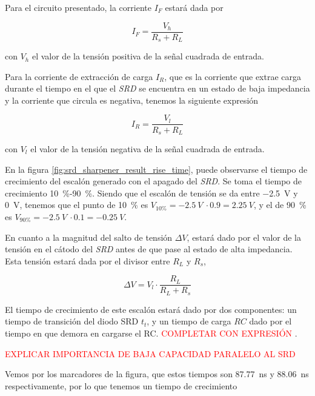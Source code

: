 Para el circuito presentado, la corriente $I_F$ estará dada por

\begin{equation}
    I_{F} = \frac{V_h}{R_s+R_L}
\end{equation}

con $V_h$ el valor de la tensión positiva de la señal cuadrada de entrada.

Para la corriente de extracción de carga $I_R$, que es la corriente que extrae
carga durante el tiempo en el que el \textit{SRD} se encuentra en un estado de
baja impedancia y la corriente que circula es negativa, tenemos la siguiente
expresión

\begin{equation}
    I_{R} = \frac{V_l}{R_s+R_L}
\end{equation}

con $V_l$ el valor de la tensión negativa de la señal cuadrada de entrada.

En la figura \ref{fig:srd_sharpener_result_rise_time}, puede observarse el
tiempo de crecimiento del escalón generado con el apagado del \textit{SRD}. Se
toma el tiempo de crecimiento \qty{10}{\percent}-\qty{90}{\percent}. Siendo que
el escalón de tensión se da entre \qty{-2.5}{\volt} y \qty{0}{\volt}, tenemos
que el punto de \qty{10}{\percent} es $V_{10\%} = -2.5 \ V \ \cdot 0.9 =  2.25 \
V$, y el de \qty{90}{\percent} es $V_{90\%} = -2.5 \ V \ \cdot 0.1 =  -0.25 \
V$.

En cuanto a la magnitud del salto de tensión $\Delta V$, estará dado por el
valor de la tensión en el cátodo del \textit{SRD} antes de que pase al estado de
alta impedancia. Esta tensión estará dada por el divisor entre $R_L$ y $R_s$,

\begin{equation}
    \Delta V = V_l \cdot \frac{R_L}{R_L+R_s}
\end{equation}

El tiempo de crecimiento de este escalón estará dado por dos componentes: un
tiempo de transición del diodo SRD $t_t$, y un tiempo de carga $RC$ dado por el
tiempo en que demora en cargarse el RC. \textcolor{red}{COMPLETAR CON EXPRESIÓN}
\cite{an918}.

\textcolor{red}{EXPLICAR IMPORTANCIA DE BAJA CAPACIDAD PARALELO AL SRD}

Vemos por los marcadores de la figura, que estos tiempos son
\qty{87.77}{\nano\second} y \qty{88.06}{\nano\second} respectivamente, por lo
que tenemos un tiempo de crecimiento

